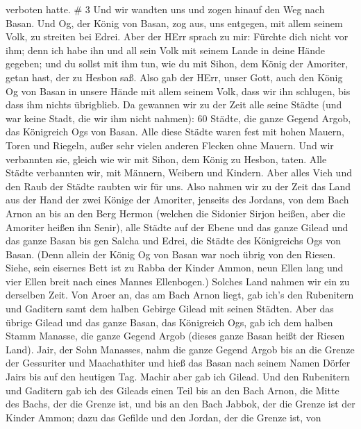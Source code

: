 verboten hatte. \# 3  Und wir wandten uns und zogen hinauf
den Weg nach Basan. Und Og, der König von Basan, zog aus, uns entgegen,
mit allem seinem Volk, zu streiten bei Edrei.  Aber der HErr
sprach zu mir: Fürchte dich nicht vor ihm; denn ich habe ihn und all
sein Volk mit seinem Lande in deine Hände gegeben; und du sollst mit ihm
tun, wie du mit Sihon, dem König der Amoriter, getan hast, der zu Hesbon
saß.  Also gab der HErr, unser Gott, auch den König Og von
Basan in unsere Hände mit allem seinem Volk, dass wir ihn schlugen, bis
dass ihm nichts übrigblieb.  Da gewannen wir zu der Zeit
alle seine Städte (und war keine Stadt, die wir ihm nicht nahmen): 60
Städte, die ganze Gegend Argob, das Königreich Ogs von Basan.
 Alle diese Städte waren fest mit hohen Mauern, Toren und
Riegeln, außer sehr vielen anderen Flecken ohne Mauern.  Und
wir verbannten sie, gleich wie wir mit Sihon, dem König zu Hesbon,
taten. Alle Städte verbannten wir, mit Männern, Weibern und Kindern.
 Aber alles Vieh und den Raub der Städte raubten wir für
uns.  Also nahmen wir zu der Zeit das Land aus der Hand der
zwei Könige der Amoriter, jenseits des Jordans, von dem Bach Arnon an
bis an den Berg Hermon  (welchen die Sidonier Sirjon heißen,
aber die Amoriter heißen ihn Senir),  alle Städte auf der
Ebene und das ganze Gilead und das ganze Basan bis gen Salcha und Edrei,
die Städte des Königreichs Ogs von Basan.  (Denn allein der
König Og von Basan war noch übrig von den Riesen. Siehe, sein eisernes
Bett ist zu Rabba der Kinder Ammon, neun Ellen lang und vier Ellen breit
nach eines Mannes Ellenbogen.)  Solches Land nahmen wir ein
zu derselben Zeit. Von Aroer an, das am Bach Arnon liegt, gab ich's den
Rubenitern und Gaditern samt dem halben Gebirge Gilead mit seinen
Städten.  Aber das übrige Gilead und das ganze Basan, das
Königreich Ogs, gab ich dem halben Stamm Manasse, die ganze Gegend Argob
(dieses ganze Basan heißt der Riesen Land).  Jair, der Sohn
Manasses, nahm die ganze Gegend Argob bis an die Grenze der Gessuriter
und Maachathiter und hieß das Basan nach seinem Namen Dörfer Jairs bis
auf den heutigen Tag.  Machir aber gab ich Gilead.
 Und den Rubenitern und Gaditern gab ich des Gileads einen
Teil bis an den Bach Arnon, die Mitte des Bachs, der die Grenze ist, und
bis an den Bach Jabbok, der die Grenze ist der Kinder Ammon;
 dazu das Gefilde und den Jordan, der die Grenze ist, von
